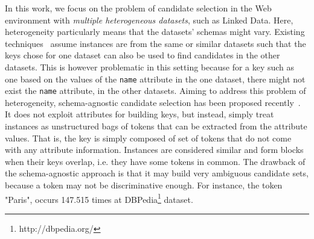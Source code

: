 In this work, we focus on the problem of candidate selection in the Web environment with \emph{multiple heterogeneous datasets}, such as Linked Data. Here, heterogeneity particularly means that the datasets' schemas might vary. Existing techniques~\cite{MichelsonK06} assume instances are from the same or similar datasets such that the keys chose for one dataset can also be used to find candidates in the other datasets. This is however problematic in this setting because for a key such as one based on the values of the \verb+name+ attribute in the one dataset, there might not exist the \verb+name+ attribute, in the other datasets. Aiming to address this problem of heterogeneity, schema-agnostic candidate selection has been proposed recently~\cite{papadakis_efficient_2011}. It does not exploit attributes for building keys, but instead, simply treat instances as unstructured bags of tokens that can be extracted from the attribute values. That is, the key is simply composed of set of tokens that do not come with any attribute information. Instances are considered similar and form blocks when their keys overlap, i.e. they have some tokens in common. The drawback of the schema-agnostic approach is that it may build very ambiguous candidate sets, because a token may not be discriminative enough. For instance, the token "Paris", occurs 147.515 times at DBPedia\footnote{http://dbpedia.org/} dataset. 


